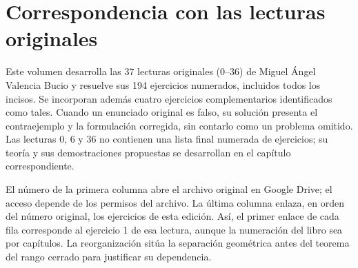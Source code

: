 \chapter*{Correspondencia con las lecturas originales}
Este volumen desarrolla las 37 lecturas originales (0--36) de Miguel Ángel Valencia Bucio y resuelve sus 194 ejercicios numerados, incluidos todos los incisos. Se incorporan además cuatro ejercicios complementarios identificados como tales. Cuando un enunciado original es falso, su solución presenta el contraejemplo y la formulación corregida, sin contarlo como un problema omitido. Las lecturas 0, 6 y 36 no contienen una lista final numerada de ejercicios; su teoría y sus demostraciones propuestas se desarrollan en el capítulo correspondiente.

El número de la primera columna abre el archivo original en Google Drive; el acceso depende de los permisos del archivo. La última columna enlaza, en orden del número original, los ejercicios de esta edición. Así, el primer enlace de cada fila corresponde al ejercicio 1 de esa lectura, aunque la numeración del libro sea por capítulos. La reorganización sitúa la separación geométrica antes del teorema del rango cerrado para justificar su dependencia.

